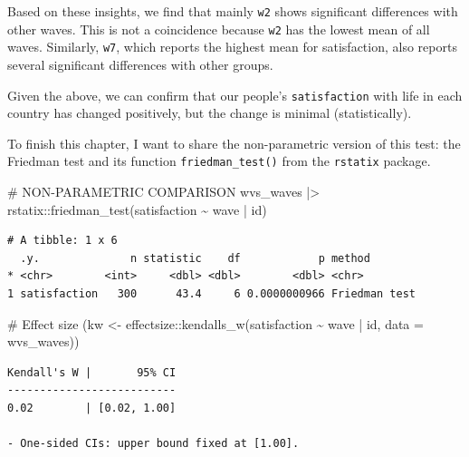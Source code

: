 \documentclass[
  letterpaper,
]{krantz}
\makeatletter
\newenvironment{Shaded}{\begin{snugshade}}{\end{snugshade}}
\newcommand{\AttributeTok}[1]{\textcolor[rgb]{0.40,0.45,0.13}{#1}}
\newcommand{\CommentTok}[1]{\textcolor[rgb]{0.37,0.37,0.37}{#1}}
\newcommand{\FunctionTok}[1]{\textcolor[rgb]{0.28,0.35,0.67}{#1}}
\newcommand{\NormalTok}[1]{\textcolor[rgb]{0.00,0.23,0.31}{#1}}
\newcommand{\OtherTok}[1]{\textcolor[rgb]{0.00,0.23,0.31}{#1}}
\newcommand{\SpecialCharTok}[1]{\textcolor[rgb]{0.37,0.37,0.37}{#1}}
\newenvironment{kframe}{%
\medskip{}
\setlength{\fboxsep}{.8em}
 \def\at@end@of@kframe{}%
 \ifinner\ifhmode%
  \def\at@end@of@kframe{\end{minipage}}%
  \begin{minipage}{\columnwidth}%
 \fi\fi%
 \def\FrameCommand##1{\hskip\@totalleftmargin \hskip-\fboxsep
 \colorbox{shadecolor}{##1}\hskip-\fboxsep
     \hskip-\linewidth \hskip-\@totalleftmargin \hskip\columnwidth}%
 \MakeFramed {\advance\hsize-\width
   \@totalleftmargin\z@ \linewidth\hsize
   \@setminipage}}%
 {\par\unskip\endMakeFramed%
 \at@end@of@kframe}
\renewenvironment{Shaded}{\begin{kframe}}{\end{kframe}}
\makeatother
\begin{document}
Based on these insights, we find that mainly \texttt{w2} shows
significant differences with other waves. This is not a coincidence
because \texttt{w2} has the lowest mean of all waves. Similarly,
\texttt{w7}, which reports the highest mean for satisfaction, also
reports several significant differences with other groups.

Given the above, we can confirm that our people's \texttt{satisfaction}
with life in each country has changed positively, but the change is
minimal (statistically).

To finish this chapter, I want to share the non-parametric version of
this test: the Friedman test and its function \texttt{friedman\_test()}
from the \texttt{rstatix} package.

\begin{Shaded}
\begin{Highlighting}[]
\CommentTok{\# NON{-}PARAMETRIC COMPARISON}
\NormalTok{wvs\_waves }\SpecialCharTok{|\textgreater{}}\NormalTok{ rstatix}\SpecialCharTok{::}\FunctionTok{friedman\_test}\NormalTok{(satisfaction }\SpecialCharTok{\textasciitilde{}}\NormalTok{ wave }\SpecialCharTok{|}\NormalTok{ id)}
\end{Highlighting}
\end{Shaded}

\begin{verbatim}
# A tibble: 1 x 6
  .y.              n statistic    df            p method       
* <chr>        <int>     <dbl> <dbl>        <dbl> <chr>        
1 satisfaction   300      43.4     6 0.0000000966 Friedman test
\end{verbatim}

\begin{Shaded}
\begin{Highlighting}[]
\CommentTok{\# Effect size}
\NormalTok{(kw }\OtherTok{\textless{}{-}}\NormalTok{ effectsize}\SpecialCharTok{::}\FunctionTok{kendalls\_w}\NormalTok{(satisfaction }\SpecialCharTok{\textasciitilde{}}\NormalTok{ wave }\SpecialCharTok{|}\NormalTok{ id,}
                       \AttributeTok{data =}\NormalTok{ wvs\_waves))}
\end{Highlighting}
\end{Shaded}

\begin{verbatim}
Kendall's W |       95% CI
--------------------------
0.02        | [0.02, 1.00]

- One-sided CIs: upper bound fixed at [1.00].
\end{verbatim}
\end{document}
